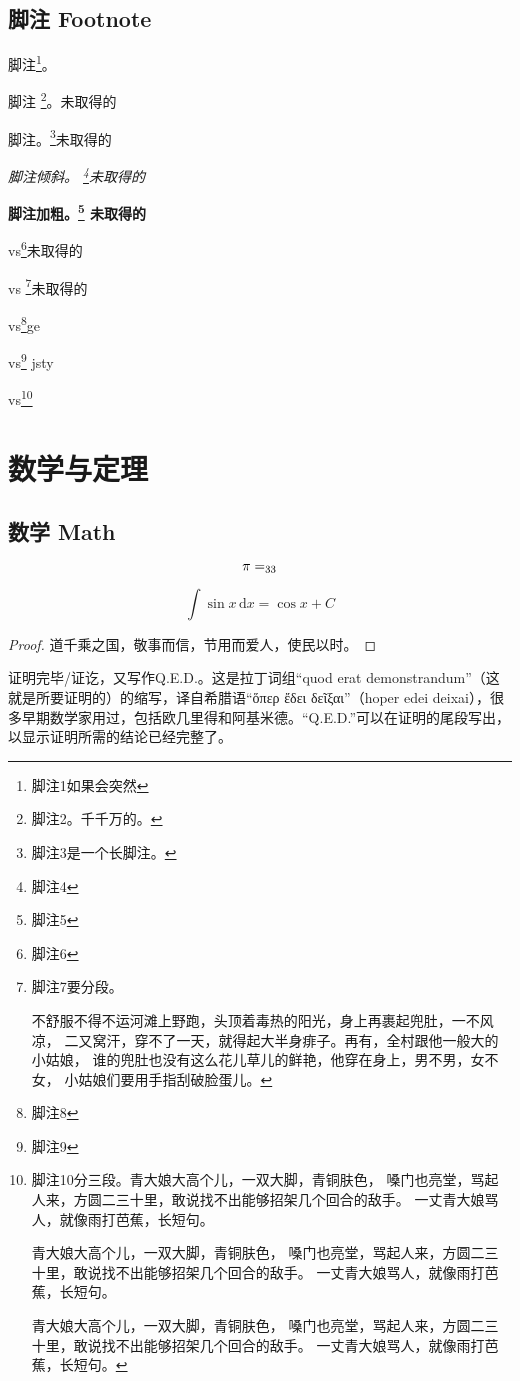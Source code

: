\clearpage

\section{脚注 Footnote}
脚注\footnote{脚注1如果会突然}。

脚注 \footnote{脚注2。千千万的。}。未取得的

脚注。\footnote{脚注3是一个长脚注。\zhlipsum*[2]}未取得的

\textit{脚注倾斜。 \footnote{脚注4}未取得的}

\textbf{脚注加粗。\footnote{脚注5} 未取得的}

vs\footnote{脚注6}未取得的

vs \footnote{脚注7要分段。\par 不舒服不得不运河滩上野跑，头顶着毒热的阳光，身上再裹起兜肚，一不风凉，
二又窝汗，穿不了一天，就得起大半身痱子。再有，全村跟他一般大的小姑娘，
谁的兜肚也没有这么花儿草儿的鲜艳，他穿在身上，男不男，女不女，
小姑娘们要用手指刮破脸蛋儿。}未取得的

vs\footnote{脚注8}ge

vs\footnote{脚注9} jsty

vs\footnote{脚注10分三段。青大娘大高个儿，一双大脚，青铜肤色，
嗓门也亮堂，骂起人来，方圆二三十里，敢说找不出能够招架几个回合的敌手。
一丈青大娘骂人，就像雨打芭蕉，长短句。\par
青大娘大高个儿，一双大脚，青铜肤色，
嗓门也亮堂，骂起人来，方圆二三十里，敢说找不出能够招架几个回合的敌手。
一丈青大娘骂人，就像雨打芭蕉，长短句。 \par
青大娘大高个儿，一双大脚，青铜肤色，
嗓门也亮堂，骂起人来，方圆二三十里，敢说找不出能够招架几个回合的敌手。
一丈青大娘骂人，就像雨打芭蕉，长短句。}

\chapter{数学与定理}
\section{数学 Math}
\[\pi=\sb{33}\]

\[
  \int\sin x\,\mathrm{d}x=\cos x + C
\]

\begin{proof}
道千乘之国，敬事而信，节用而爱人，使民以时。
\end{proof}

\begin{definition}
证明完毕/证讫，又写作Q.E.D.。这是拉丁词组“quod erat demonstrandum”（这就是所要证明的）的缩写，译自希腊语“ὅπερ ἔδει δεῖξαι”（hoper edei deixai），很多早期数学家用过，包括欧几里得和阿基米德。“Q.E.D.”可以在证明的尾段写出，以显示证明所需的结论已经完整了。
\end{definition}

